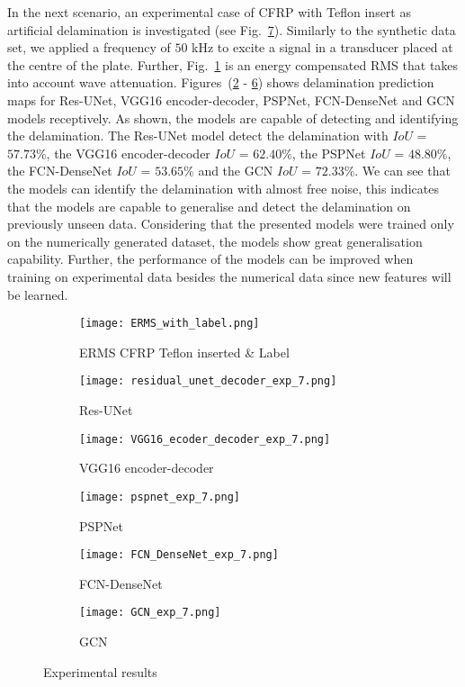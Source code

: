 In the next scenario, an experimental case of CFRP with Teflon insert as artificial delamination is investigated (see Fig.~\ref{fig:Exp_ERMS_teflon}).  
Similarly to the synthetic data set, we applied a frequency of \(50\) kHz to excite a signal in a transducer placed at the centre of the plate. 
Further, Fig.~\ref{fig:Delamination} is an energy compensated RMS that takes into account wave attenuation. 
Figures~(\ref{fig:unet_exp_7_} - \ref{fig:gcn_exp}) shows delamination prediction maps for Res-UNet, VGG16 encoder-decoder, PSPNet, FCN-DenseNet and GCN models receptively.
As shown, the models are capable of detecting and identifying the delamination. 
The Res-UNet model detect the delamination with \(IoU\) = \(57.73\%\), the VGG16 encoder-decoder \(IoU\)  = \(62.40\%\), the PSPNet \(IoU\) = \(48.80\%\), the FCN-DenseNet \(IoU\) = \(53.65\%\) and the GCN \(IoU\) = \(72.33\%\).
We can see that the models can identify the delamination with almost free noise, this indicates that the models are capable to generalise and detect the delamination on previously unseen data. 
Considering that the presented models were trained only on the numerically generated dataset, the models show great generalisation capability.
Further, the performance of the models can be improved when training on experimental data besides the numerical data since new features will be learned. 
\begin{figure} [!h]
	\centering
	\begin{subfigure}[b]{0.47\textwidth}
		\centering
		\texttt{[image: ERMS\_with\_label.png]}
		\caption{ERMS CFRP Teflon inserted \& Label}
		\label{fig:Delamination}	
	\end{subfigure}	
	\hfill
	\begin{subfigure}[b]{0.47\textwidth}
		\centering
		\texttt{[image: residual\_unet\_decoder\_exp\_7.png]}
		\caption{Res-UNet} 
		\label{fig:unet_exp_7_}
	\end{subfigure}
	\hfill
	\begin{subfigure}[b]{0.47\textwidth}
		\centering
		\texttt{[image: VGG16\_ecoder\_decoder\_exp\_7.png]}
		\caption{VGG16 encoder-decoder} 
		\label{fig:vgg16_exp_7_}
	\end{subfigure}
	\hfill
	\begin{subfigure}[b]{0.47\textwidth}
		\centering
		\texttt{[image: pspnet\_exp\_7.png]}
		\caption{PSPNet} 
		\label{fig:pspnet_exp_7_}
	\end{subfigure}
	\hfill
	\begin{subfigure}[b]{0.47\textwidth}
		\centering
		\texttt{[image: FCN\_DenseNet\_exp\_7.png]}
		\caption{FCN-DenseNet} 
		\label{fig:fcn_densenet_exp}
	\end{subfigure}
	\hfill
	\begin{subfigure}[b]{0.47\textwidth}
		\centering
		\texttt{[image: GCN\_exp\_7.png]}
		\caption{GCN} 
		\label{fig:gcn_exp}
	\end{subfigure}
	\caption{Experimental results}
	\label{fig:Exp_ERMS_teflon}
\end{figure}
